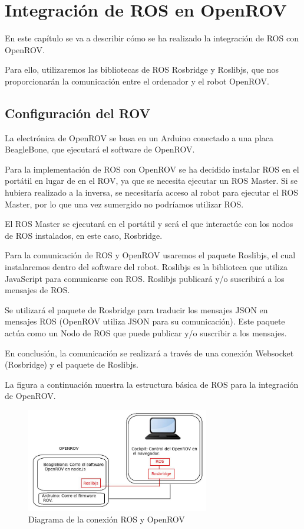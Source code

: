 \chapter{Integración de ROS en OpenROV}
\label{cap:integracionROS}

En este capítulo se va a describir cómo se ha realizado la integración de ROS con OpenROV\cite{ros_rov}.

Para ello, utilizaremos las bibliotecas de ROS Rosbridge y Roslibjs, que nos proporcionarán la comunicación entre el ordenador y el robot OpenROV.

\section{Configuración del ROV}
\label{cap:Configuracion del ROV}
La electrónica de OpenROV se basa en un Arduino conectado a una placa BeagleBone, que ejecutará el software de OpenROV.

Para la implementación de ROS con OpenROV se ha decidido instalar ROS en el portátil en lugar de en el ROV, ya que se necesita ejecutar un ROS Master. Si se hubiera realizado a la inversa, se necesitaría acceso al robot para ejecutar el ROS Master, por lo que una vez sumergido no podríamos utilizar ROS.

El ROS Master se ejecutará en el portátil y será el que interactúe con los nodos de ROS instalados, en este caso, Rosbridge.

Para la comunicación de ROS y OpenROV usaremos el paquete Roslibjs, el cual instalaremos dentro del software del robot. Roslibjs es la biblioteca que utiliza JavaScript para comunicarse con ROS. Roslibjs publicará y/o suscribirá a los mensajes de ROS.

Se utilizará el paquete de Rosbridge para traducir los mensajes JSON en mensajes ROS (OpenROV utiliza JSON para su comunicación). Este paquete actúa como un Nodo de ROS que puede publicar y/o suscribir a los mensajes.

En conclusión, la comunicación se realizará a través de una conexión Websocket (Rosbridge) y el paquete de Roslibjs.

La figura a continuación muestra la estructura básica de ROS para la integración de OpenROV.

\begin{figure} [hbtp]
  \begin{center}
    \includegraphics[width=8cm]{img/cap4/conect_ros_rov}
  \end{center}
  \caption{Diagrama de la conexión ROS y OpenROV}
  \label{fig:conect_ros_rov}
\end{figure}

